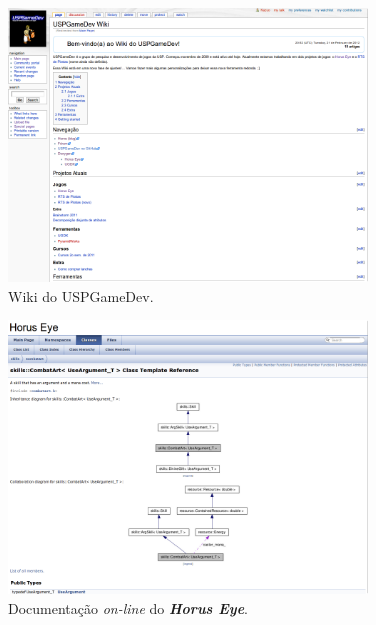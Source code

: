 \documentclass[12pt,onecolumn,a4paper]{article}
\begin{document}
        \begin{figure}[htb]
            \centering
            \includegraphics[width=0.85\textwidth]{images/site_03.png}
            \caption{Wiki do USPGameDev.}
            \label{fig:site_03}
        \end{figure}
        
        \begin{figure}[htb]
            \centering
            \includegraphics[width=0.85\textwidth]{images/site_04.png}
            \caption{Documentação \textit{on-line} do \textit{\textbf{Horus Eye}}.}
            \label{fig:site_04}
        \end{figure}
        
\end{document}
